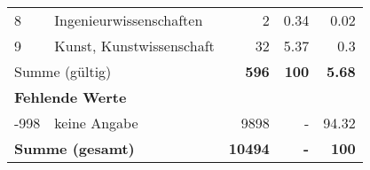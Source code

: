 \begin{longtable}{lXrrr}
     8 &
     \multicolumn{1}{X}{ Ingenieurwissenschaften   } &


       \num{2} &
       \num[round-mode=places,round-precision=2]{0.34} &
         \num[round-mode=places,round-precision=2]{0.02} \\

     9 &
     \multicolumn{1}{X}{ Kunst, Kunstwissenschaft   } &


       \num{32} &
       \num[round-mode=places,round-precision=2]{5.37} &
         \num[round-mode=places,round-precision=2]{0.3} \\
     \midrule
     \multicolumn{2}{l}{Summe (gültig)} &
       \textbf{\num{596}} &
     \textbf{\num{100}} &
       \textbf{\num[round-mode=places,round-precision=2]{5.68}} \\
     \multicolumn{5}{l}{\textbf{Fehlende Werte}}\\
       -998 &
       keine Angabe &
         \num{9898} &
        - &
         \num[round-mode=places,round-precision=2]{94.32} \\
     \midrule
     \multicolumn{2}{l}{\textbf{Summe (gesamt)}} &
          \textbf{\num{10494}} &
        \textbf{-} &
        \textbf{\num{100}} \\
     \bottomrule
     \end{longtable}
     
